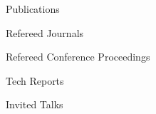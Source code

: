 
\begin{rSection}{Publications}
  \begin{rSubsection}{Refereed Journals}{}{}{}
    \printbibliography[keyword=journal,heading=none]
  \end{rSubsection}
  \begin{rSubsection}{Refereed Conference Proceedings}{}{}{}
    \printbibliography[keyword=proceeding,heading=none]
  \end{rSubsection}
  \begin{rSubsection}{Tech Reports}{}{}{}
    \printbibliography[keyword=techReport,heading=none]
  \end{rSubsection}
  \begin{rSubsection}{Invited Talks}{}{}{}
    \printbibliography[keyword=invitedTalk,heading=none]
  \end{rSubsection}
\end{rSection}
